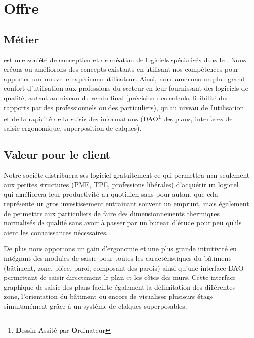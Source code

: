 \chapter{Offre}
\section{Métier}
\K{} est une société de conception et de création de
logiciels spécialisés dans le \gHabitat{}. Nous créons
ou améliorons des concepts existants en utilisant nos compétences
pour apporter une nouvelle expérience utilisateur. Ainsi, nous amenons
un plus grand confort d'utilisation aux professions du secteur en
leur fournissant des logiciels de qualité, autant au niveau du rendu
\mbox{final} (précision des calculs, lisibilité des rapports par des
professionnels ou des particuliers), qu'au niveau de l'utilisation
et de la rapidité de la saisie des informations
(DAO\footnote{\textbf{D}essin \textbf{A}ssité par \textbf{O}rdinateur} des plans,
interfaces de saisie ergonomique, superposition de calques).
\section{Valeur pour le client}
Notre société distribuera ses logiciel gratuitement ce qui permettra non
seulement aux petites structures (PME, TPE, professions libérales)
d'acquérir un logiciel qui améliorera leur productivité
au quotidien sans pour autant que cela représente un gros investissement 
entrainant souvent un emprunt,
mais également de permettre aux particuliers de faire des dimensionnements
thermiques normalisés de qualité sans avoir à passer par un bureau d'étude
pour peu qu'ils aient les connaissances nécessaires.

De plus nous apportons un gain d'ergonomie et une plus grande intuitivité
en intégrant des modules de saisie pour toutes les caractéristiques du bâtiment 
(bâtiment, zone, pièce, paroi, composant des parois) ainsi qu'une interface DAO
permettant de saisir directement le plan et les côtes des murs. Cette interface
graphique de saisie des plans facilite également la délimitation des différentes zone,
l'orientation du bâtiment ou encore de visualiser plusieurs étage simultanément grâce
à un système de clalques superposables.
